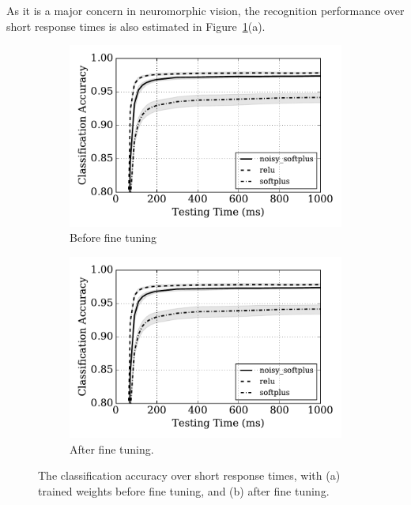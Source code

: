 	
	As it is a major concern in neuromorphic vision, the recognition performance over short response times is also estimated in Figure~\ref{fig:ca_time}(a).
	\begin{figure}[bt!]
		\centering
		\begin{subfigure}[t]{0.49\textwidth}
			\includegraphics[width=\textwidth]{pics_iconip/8-2.pdf}
		    \caption{Before fine tuning}
		\end{subfigure}
		\begin{subfigure}[t]{0.49\textwidth}
			\includegraphics[width=\textwidth]{pics_iconip/8-2.pdf}
		    \caption{After fine tuning.}
		\end{subfigure}

		\caption{The classification accuracy over short response times, with (a) trained weights before fine tuning, and (b) after fine tuning.}
		\label{fig:ca_time}	
	\end{figure}

